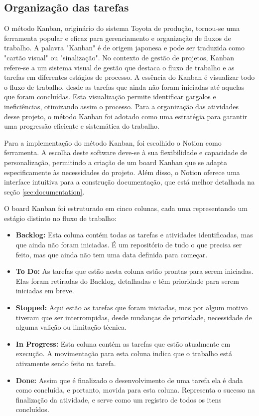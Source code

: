 \subsection{Organização das tarefas}\label{sec:taskOrganization}
O método Kanban, originário do sistema Toyota de produção, tornou-se uma ferramenta popular e eficaz para gerenciamento e organização de fluxos de trabalho. A palavra "Kanban" é de origem japonesa e pode ser traduzida como "cartão visual" ou "sinalização". No contexto de gestão de projetos, Kanban refere-se a um sistema visual de gestão que destaca o fluxo de trabalho e as tarefas em diferentes estágios de processo. A essência do Kanban é visualizar todo o fluxo de trabalho, desde as tarefas que ainda não foram iniciadas até aquelas que foram concluídas. Esta visualização permite identificar gargalos e ineficiências, otimizando assim o processo. Para a organização das atividades desse projeto, o método Kanban foi adotado como uma estratégia para garantir uma progressão eficiente e sistemática do trabalho.

Para a implementação do método Kanban, foi escolhido o Notion como ferramenta. A escolha deste software deve-se à sua flexibilidade e capacidade de personalização, permitindo a criação de um board Kanban que se adapta especificamente às necessidades do projeto. Além disso, o Notion oferece uma interface intuitiva para a construção documentação, que está melhor detalhada na seção \ref{sec:documentation}.

O board Kanban foi estruturado em cinco colunas, cada uma representando um estágio distinto no fluxo de trabalho:

\begin{itemize}
    \item \textbf{Backlog:} Esta coluna contém todas as tarefas e atividades identificadas, mas que ainda não foram iniciadas. É um repositório de tudo o que precisa ser feito, mas que ainda não tem uma data definida para começar.
    \item \textbf{To Do:} As tarefas que estão nesta coluna estão prontas para serem iniciadas. Elas foram retiradas do Backlog, detalhadas e têm prioridade para serem iniciadas em breve.
    \item \textbf{Stopped:} Aqui estão as tarefas que foram iniciadas, mas por algum motivo tiveram que ser interrompidas, desde mudanças de prioridade, necessidade de alguma valição ou limitação técnica.
    \item \textbf{In Progress:} Esta coluna contém as tarefas que estão atualmente em execução. A movimentação para esta coluna indica que o trabalho está ativamente sendo feito na tarefa.
    \item \textbf{Done:} Assim que é finalizado o desenvolvimento de uma tarefa ela é dada como concluída, e portanto, movida para esta coluna. Representa o sucesso na finalização da atividade, e serve como um registro de todos os itens concluídos.
\end{itemize}

